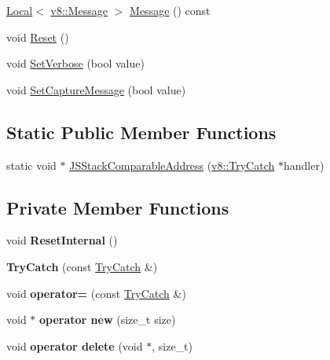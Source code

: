 \begin{DoxyCompactItemize}
\item 
\hyperlink{classv8_1_1_local}{Local}$<$ \hyperlink{classv8_1_1_message}{v8\+::\+Message} $>$ \hyperlink{classv8_1_1_try_catch_a2811e500fbb906ee505895a3d94fc66f}{Message} () const 
\item 
void \hyperlink{classv8_1_1_try_catch_a3aae8acab4c99b374b7d782763d4c8e1}{Reset} ()
\item 
void \hyperlink{classv8_1_1_try_catch_a032cd889d76bd596e2616df11ced8682}{Set\+Verbose} (bool value)
\item 
void \hyperlink{classv8_1_1_try_catch_a541b8fa6951bd5a439692c22d5c7b73c}{Set\+Capture\+Message} (bool value)
\end{DoxyCompactItemize}
\subsection*{Static Public Member Functions}
\begin{DoxyCompactItemize}
\item 
static void $\ast$ \hyperlink{classv8_1_1_try_catch_ac2e6359fa11a2aba609af82fb80cf07a}{J\+S\+Stack\+Comparable\+Address} (\hyperlink{classv8_1_1_try_catch}{v8\+::\+Try\+Catch} $\ast$handler)
\end{DoxyCompactItemize}
\subsection*{Private Member Functions}
\begin{DoxyCompactItemize}
\item 
void {\bfseries Reset\+Internal} ()\hypertarget{classv8_1_1_try_catch_ae0c8d52ffa44aaae9f9ed6aed8571aa6}{}\label{classv8_1_1_try_catch_ae0c8d52ffa44aaae9f9ed6aed8571aa6}

\item 
{\bfseries Try\+Catch} (const \hyperlink{classv8_1_1_try_catch}{Try\+Catch} \&)\hypertarget{classv8_1_1_try_catch_a2ef3ec2db82538e0ff5540afe0f3660e}{}\label{classv8_1_1_try_catch_a2ef3ec2db82538e0ff5540afe0f3660e}

\item 
void {\bfseries operator=} (const \hyperlink{classv8_1_1_try_catch}{Try\+Catch} \&)\hypertarget{classv8_1_1_try_catch_aee3add8ba92eff66fdb22af91fce847d}{}\label{classv8_1_1_try_catch_aee3add8ba92eff66fdb22af91fce847d}

\item 
void $\ast$ {\bfseries operator new} (size\+\_\+t size)\hypertarget{classv8_1_1_try_catch_abe99b582257e711aa72730ddf6661100}{}\label{classv8_1_1_try_catch_abe99b582257e711aa72730ddf6661100}

\item 
void {\bfseries operator delete} (void $\ast$, size\+\_\+t)\hypertarget{classv8_1_1_try_catch_ad400a5dc4796e85d3d97a0e612adf0f8}{}\label{classv8_1_1_try_catch_ad400a5dc4796e85d3d97a0e612adf0f8}

\end{DoxyCompactItemize}
